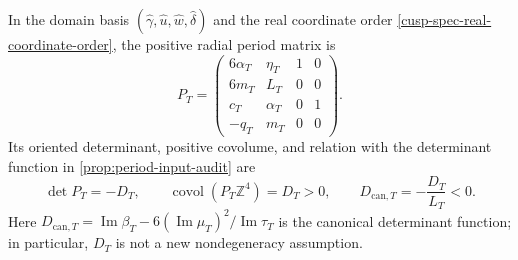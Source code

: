 \begin{proposition}
\label{cusp-spec-exact-dual-lattice}
In the domain basis
\((\widehat\gamma,\widehat u,\widehat w,\widehat\delta)\) and the real
coordinate order \cref{cusp-spec-real-coordinate-order}, the positive radial
period matrix is
\begin{equation}
 P_T=
 \begin{pmatrix}
  6\alpha_T&\eta_T&1&0\\
  6m_T&L_T&0&0\\
  c_T&\alpha_T&0&1\\
  -q_T&m_T&0&0
 \end{pmatrix}.
 \label{cusp-spec-real-period-matrix}
\end{equation}
Its oriented determinant, positive covolume, and relation with the determinant
function in \cref{prop:period-input-audit} are
\begin{equation}
 \det P_T=-D_T,
 \qquad \operatorname{covol}(P_T\mathbb Z^4)=D_T>0,
 \qquad
 D_{\mathrm{can},T}=-\frac{D_T}{L_T}<0.
 \label{cusp-spec-determinant}
\end{equation}
Here
\(D_{\mathrm{can},T}=\operatorname{Im}\beta_T
-6(\operatorname{Im}\mu_T)^2/\operatorname{Im}\tau_T\) is the canonical
determinant function; in particular, \(D_T\) is not a new nondegeneracy
assumption.


\end{proposition}
